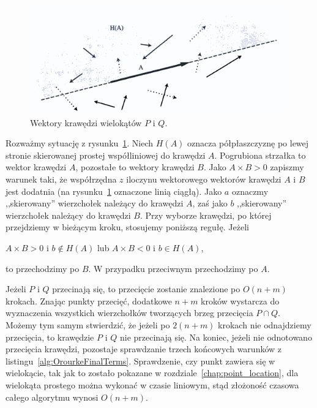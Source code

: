 \begin{figure}[htb]
  \centering
  \includegraphics[scale=0.7]{img/vectors}
  \caption{\label{img:advance} Wektory krawędzi wielokątów $P$ i $Q$.}
\end{figure}

Rozważmy sytuację z rysunku~\ref{img:advance}. Niech $H(A)$ oznacza
półpłaszczyznę po lewej stronie skierowanej prostej współliniowej do
krawędzi $A$. Pogrubiona strzałka to wektor krawędzi $A$, pozostałe to
wektory krawędzi $B$.  Jako $A \times B > 0$ zapiszmy warunek taki, że
współrzędna $z$ iloczynu wektorowego wektorów krawędzi $A$ i $B$ jest
dodatnia (na rysunku~\ref{img:advance} oznaczone linią ciągłą). Jako
$a$ oznaczmy ,,skierowany'' wierzchołek należący do krawędzi $A$, zaś
jako $b$ ,,skierowany'' wierzchołek należący do krawędzi $B$. Przy
wyborze krawędzi, po której przejdziemy w bieżącym kroku, stosujemy
poniższą regułę. Jeżeli

\begin{center}
  $A \times B > 0 $ i $b \notin H(A)$ lub $A \times B < 0 $ i $b \in
  H(A)$,
\end{center}

to przechodzimy po $B$. W przypadku przeciwnym przechodzimy po $A$.

Jeżeli $P$ i $Q$ przecinają się, to przecięcie zostanie znalezione po
$O(n+m)$ krokach. Znając punkty przecięć, dodatkowe $n+m$ kroków
wystarcza do wyznaczenia wszystkich wierzchołków tworzących brzeg
przecięcia $P \cap Q$. Możemy tym samym stwierdzić, że jeżeli po
$2(n+m)$ krokach nie odnajdziemy przecięcia, to krawędzie $P$ i $Q$
nie przecinają się. Na koniec, jeżeli nie odnotowano przecięcia
krawędzi, pozostaje sprawdzanie trzech końcowych warunków z
listingu~\ref{alg:OrourkeFinalTerms}. Sprawdzenie, czy punkt zawiera
się w wielokącie, tak jak to zostało pokazane w
rozdziale~\ref{chap:point_location}, dla wielokąta prostego można
wykonać w czasie liniowym, stąd złożoność czasowa całego algorytmu
wynosi $O(n + m)$.

